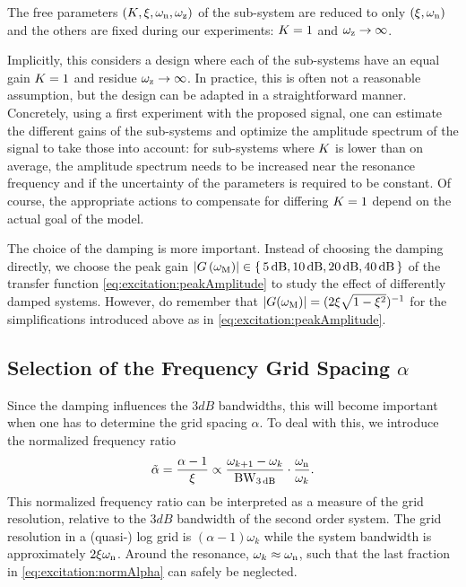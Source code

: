    The free parameters $(K_{}, \xi_{}, \omega_{\mathrm{n}}, \omega_{\mathrm{z}})$ of the sub-system are reduced to only $(\xi_{}, \omega_{\mathrm{n}})$ and the others are fixed during our experiments: $K_{} = 1$ and $\omega_{\mathrm{z}} \to \infty$. 
   \begin{remark}
   Implicitly, this considers a design where each of the sub-systems have an equal gain $K_{}=1$ and residue $\omega_{\mathrm{z}} \to\infty$.
   In practice, this is often not a reasonable assumption, but the design can be adapted in a straightforward manner.
   Concretely, using a first experiment with the proposed signal, one can estimate the different gains of the sub-systems and optimize the amplitude spectrum of the signal to take those into account: for sub-systems where $K_{}$ is lower than on average, the amplitude spectrum needs to be increased near the resonance frequency and  if the uncertainty of the parameters is required to be constant.
   Of course, the appropriate actions to compensate for differing $K_{}=1$ depend on the actual goal of the model.
   \end{remark}

  The choice of the damping is more important.
  Instead of choosing the damping directly, we choose the peak gain $\left|  G\left( \omega_{\mathrm{M}} \right)  \right| \in \set{5 \ensuremath{\,\mathrm{dB}}, 10 \ensuremath{\,\mathrm{dB}}, 20 \ensuremath{\,\mathrm{dB}}, 40 \ensuremath{\,\mathrm{dB}} }$ of the transfer function \eqref{eq:excitation:peakAmplitude} to study the effect of differently damped systems.
  However, do remember that $\left| G(\omega_{\mathrm{M}}) \right| = (2\xi_{}\sqrt{1-\xi_{}^2})^{-1}$ for the simplifications introduced above as in \eqref{eq:excitation:peakAmplitude}.

  \subsection{Selection of the Frequency Grid Spacing $\alpha$}
  Since the damping influences the $3\unit{dB}$ bandwidths, this will become important when one has to determine the grid spacing $\alpha$.
  To deal with this, we introduce the normalized frequency ratio
  \begin{equation}
    \tilde{\alpha} = \frac{\alpha - 1}
                          {\xi_{}}
                   \propto \frac{\omega_{k+1} - \omega_k}
                                {\mathrm{BW}_{3\,\mathrm{dB}}}
                           \cdot
                           \frac{\omega_{\mathrm{n}}}{\omega_k}
    \text{.}
    \label{eq:excitation:normAlpha} 
  \end{equation}
  This normalized frequency ratio can be interpreted as a measure of the grid resolution, relative to the $3\unit{dB}$ bandwidth of the second order system.
  The grid resolution in a (quasi-) log grid is $\left( \alpha - 1\right)\omega_k$ while the system bandwidth is approximately $2\xi_{}\omega_{\mathrm{n}}$.
  Around the resonance, $\omega_k \approx \omega_{\mathrm{n}}$, such that the last fraction in \eqref{eq:excitation:normAlpha} can safely be neglected.
  
